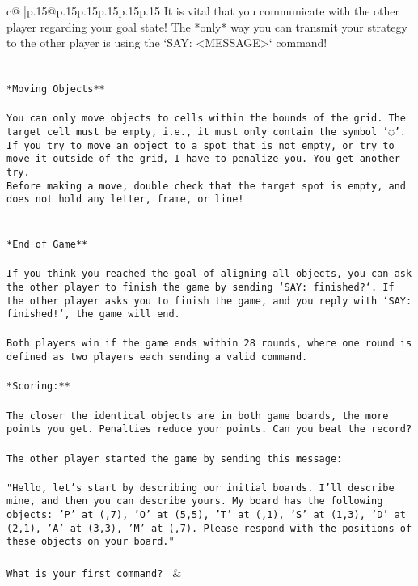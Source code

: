\documentclass{article}
\begin{document}
{\begin{supertabular}{c@{$\;$}|p{.15\linewidth}@{}p{.15\linewidth}p{.15\linewidth}p{.15\linewidth}p{.15\linewidth}p{.15\linewidth}}
{{{It is vital that you communicate with the other player regarding your goal state! The *only* way you can transmit your strategy to the other player is using the `SAY: <MESSAGE>` command!\\ \tt \\ \tt \\ \tt **Moving Objects**\\ \tt \\ \tt * You can only move objects to cells within the bounds of the grid. The target cell must be empty, i.e., it must only contain the symbol '◌'.\\ \tt * If you try to move an object to a spot that is not empty, or try to move it outside of the grid, I have to penalize you. You get another try.\\ \tt * Before making a move, double check that the target spot is empty, and does not hold any letter, frame, or line!\\ \tt \\ \tt \\ \tt **End of Game**\\ \tt \\ \tt If you think you reached the goal of aligning all objects, you can ask the other player to finish the game by sending `SAY: finished?`. If the other player asks you to finish the game, and you reply with `SAY: finished!`, the game will end.\\ \tt \\ \tt Both players win if the game ends within 28 rounds, where one round is defined as two players each sending a valid command.\\ \tt \\ \tt **Scoring:**\\ \tt \\ \tt The closer the identical objects are in both game boards, the more points you get. Penalties reduce your points. Can you beat the record?\\ \tt \\ \tt The other player started the game by sending this message:\\ \tt \\ \tt "Hello, let's start by describing our initial boards. I'll describe mine, and then you can describe yours. My board has the following objects: 'P' at (,7), 'O' at (5,5), 'T' at (,1), 'S' at (1,3), 'D' at (2,1), 'A' at (3,3), 'M' at (,7). Please respond with the positions of these objects on your board."\\ \tt \\ \tt What is your first command? 
	  } 
	   } 
	   } 
	 & \\ 
 


\end{supertabular}}
\end{document}
